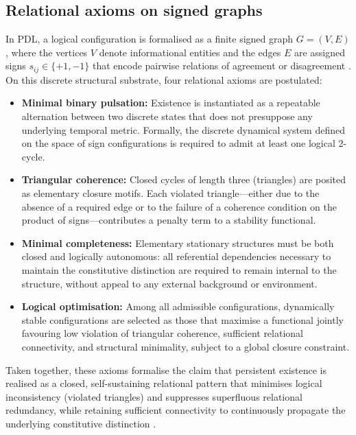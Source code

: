 \documentclass{article}
\begin{document}
\subsection{Relational axioms on signed graphs}
\label{subsec:axioms}

In PDL, a logical configuration is formalised as a finite signed graph \(G = (V, E)\), where the vertices \(V\) denote informational entities and the edges \(E\) are assigned signs \(s_{ij} \in \{+1, -1\}\) that encode pairwise relations of agreement or disagreement \citep{PDL_Main_2026,PDL_intro}. On this discrete structural substrate, four relational axioms are postulated:

\begin{itemize}[leftmargin=1.5em]
  \item \textbf{Minimal binary pulsation:} Existence is instantiated as a repeatable alternation between two discrete states that does not presuppose any underlying temporal metric. Formally, the discrete dynamical system defined on the space of sign configurations is required to admit at least one logical 2-cycle.

  \item \textbf{Triangular coherence:} Closed cycles of length three (triangles) are posited as elementary closure motifs. Each violated triangle—either due to the absence of a required edge or to the failure of a coherence condition on the product of signs—contributes a penalty term to a stability functional.

  \item \textbf{Minimal completeness:} Elementary stationary structures must be both closed and logically autonomous: all referential dependencies necessary to maintain the constitutive distinction are required to remain internal to the structure, without appeal to any external background or environment.

  \item \textbf{Logical optimisation:} Among all admissible configurations, dynamically stable configurations are selected as those that maximise a functional jointly favouring low violation of triangular coherence, sufficient relational connectivity, and structural minimality, subject to a global closure constraint.
\end{itemize}

Taken together, these axioms formalise the claim that persistent existence is realised as a closed, self-sustaining relational pattern that minimises logical inconsistency (violated triangles) and suppresses superfluous relational redundancy, while retaining sufficient connectivity to continuously propagate the underlying constitutive distinction \citep{PDL_Main_2026,PDL_position}.
\end{document}
